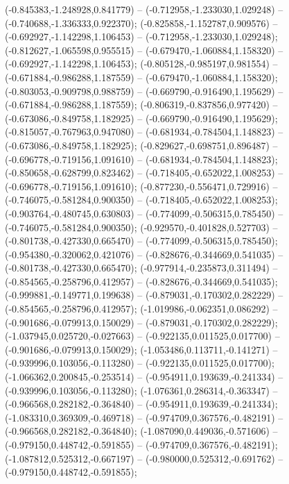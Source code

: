  (-0.845383,-1.248928,0.841779) -- (-0.712958,-1.233030,1.029248) -- (-0.740688,-1.336333,0.922370);
 (-0.825858,-1.152787,0.909576) -- (-0.692927,-1.142298,1.106453) -- (-0.712958,-1.233030,1.029248);
 (-0.812627,-1.065598,0.955515) -- (-0.679470,-1.060884,1.158320) -- (-0.692927,-1.142298,1.106453);
 (-0.805128,-0.985197,0.981554) -- (-0.671884,-0.986288,1.187559) -- (-0.679470,-1.060884,1.158320);
 (-0.803053,-0.909798,0.988759) -- (-0.669790,-0.916490,1.195629) -- (-0.671884,-0.986288,1.187559);
 (-0.806319,-0.837856,0.977420) -- (-0.673086,-0.849758,1.182925) -- (-0.669790,-0.916490,1.195629);
 (-0.815057,-0.767963,0.947080) -- (-0.681934,-0.784504,1.148823) -- (-0.673086,-0.849758,1.182925);
 (-0.829627,-0.698751,0.896487) -- (-0.696778,-0.719156,1.091610) -- (-0.681934,-0.784504,1.148823);
 (-0.850658,-0.628799,0.823462) -- (-0.718405,-0.652022,1.008253) -- (-0.696778,-0.719156,1.091610);
 (-0.877230,-0.556471,0.729916) -- (-0.746075,-0.581284,0.900350) -- (-0.718405,-0.652022,1.008253);
 (-0.903764,-0.480745,0.630803) -- (-0.774099,-0.506315,0.785450) -- (-0.746075,-0.581284,0.900350);
 (-0.929570,-0.401828,0.527703) -- (-0.801738,-0.427330,0.665470) -- (-0.774099,-0.506315,0.785450);
 (-0.954380,-0.320062,0.421076) -- (-0.828676,-0.344669,0.541035) -- (-0.801738,-0.427330,0.665470);
 (-0.977914,-0.235873,0.311494) -- (-0.854565,-0.258796,0.412957) -- (-0.828676,-0.344669,0.541035);
 (-0.999881,-0.149771,0.199638) -- (-0.879031,-0.170302,0.282229) -- (-0.854565,-0.258796,0.412957);
 (-1.019986,-0.062351,0.086292) -- (-0.901686,-0.079913,0.150029) -- (-0.879031,-0.170302,0.282229);
 (-1.037945,0.025720,-0.027663) -- (-0.922135,0.011525,0.017700) -- (-0.901686,-0.079913,0.150029);
 (-1.053486,0.113711,-0.141271) -- (-0.939996,0.103056,-0.113280) -- (-0.922135,0.011525,0.017700);
 (-1.066362,0.200845,-0.253514) -- (-0.954911,0.193639,-0.241334) -- (-0.939996,0.103056,-0.113280);
 (-1.076361,0.286314,-0.363347) -- (-0.966568,0.282182,-0.364840) -- (-0.954911,0.193639,-0.241334);
 (-1.083310,0.369309,-0.469718) -- (-0.974709,0.367576,-0.482191) -- (-0.966568,0.282182,-0.364840);
 (-1.087090,0.449036,-0.571606) -- (-0.979150,0.448742,-0.591855) -- (-0.974709,0.367576,-0.482191);
 (-1.087812,0.525312,-0.667197) -- (-0.980000,0.525312,-0.691762) -- (-0.979150,0.448742,-0.591855);
